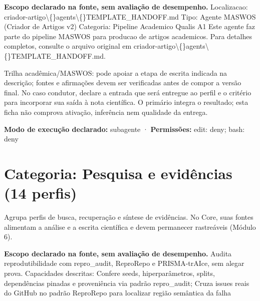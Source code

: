 
\begin{descricao}
\textbf{Escopo declarado na fonte, sem avaliação de desempenho.}
Localizacao: criador-artigo\textbackslash\{\}agents\textbackslash\{\}TEMPLATE\_HANDOFF.md Tipo: Agente MASWOS (Criador de Artigos v2) Categoria: Pipeline Academico Qualis A1 Este agente faz parte do pipeline MASWOS para producao de artigos academicos. Para detalhes completos, consulte o arquivo original em criador-artigo\textbackslash\{\}agents\textbackslash\{\}TEMPLATE\_HANDOFF.md.
\end{descricao}

\begin{funcao}
Trilha acadêmica/MASWOS: pode apoiar a etapa de escrita indicada na descrição; fontes e afirmações devem ser verificadas antes de compor a versão final. No caso condutor, declare a entrada que será entregue ao perfil e o critério para incorporar sua saída à nota científica. O primário integra o resultado; esta ficha não comprova ativação, inferência nem qualidade da entrega.
\end{funcao}

\begin{arquitetura}
\textbf{Modo de execução declarado:} subagente · \textbf{Permissões:} edit: deny; bash: deny
\end{arquitetura}

\clearpage
\section{Categoria: Pesquisa e evidências (14 perfis)}

\begin{descricao}
Agrupa perfis de busca, recuperação e síntese de evidências. No Core, suas fontes alimentam a análise e a escrita científica e devem permanecer rastreáveis (Módulo 6).
\end{descricao}


\begin{descricao}
\textbf{Escopo declarado na fonte, sem avaliação de desempenho.}
Audita reprodutibilidade com repro\_audit, ReproRepo e PRISMA-trAIce, sem alegar prova. Capacidades descritas: Confere seeds, hiperparâmetros, splits, dependências pinadas e proveniência via padrão repro\_audit; Cruza issues reais do GitHub no padrão ReproRepo para localizar região semântica da falha
\end{descricao}

